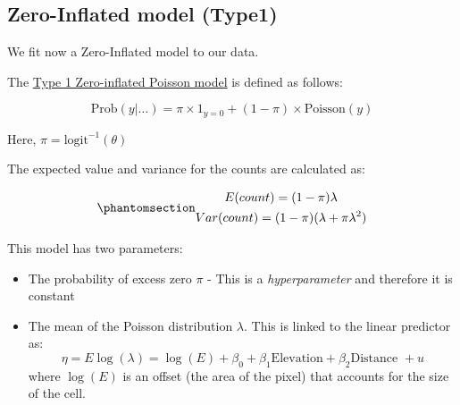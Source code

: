 \documentclass[
  letterpaper,
  DIV=11,
  numbers=noendperiod]{scrartcl}
\providecommand{\tightlist}{%
  \setlength{\itemsep}{0pt}\setlength{\parskip}{0pt}}\usepackage{longtable,booktabs,array}
\begin{document}
\subsection{Zero-Inflated model (Type1)}\label{sec-zip}

We fit now a Zero-Inflated model to our data.

The
\href{https://inla.r-inla-download.org/r-inla.org/doc/likelihood/zeroinflated.pdf}{Type
1 Zero-inflated Poisson model} is defined as follows:

\[
\text{Prob}(y\vert\dots)=\pi\times 1_{y=0}+(1-\pi)\times \text{Poisson}(y)
\]

Here, \(\pi=\text{logit}^{-1}(\theta)\)

The expected value and variance for the counts are calculated as:

\begin{equation}\phantomsection\label{eq-mean-zip}{
\begin{gathered}
E(count)=(1-\pi)\lambda \\
Var(count)= (1-\pi)(\lambda+\pi \lambda^2)
\end{gathered}
}\end{equation}

This model has two parameters:

\begin{itemize}
\tightlist
\item
  The probability of excess zero \(\pi\) - This is a
  \emph{hyperparameter} and therefore it is constant
\item
  The mean of the Poisson distribution \(\lambda\). This is linked to
  the linear predictor as: \[
  \eta = E\log(\lambda) = \log(E) + \beta_0 + \beta_1\text{Elevation} + \beta_2\text{Distance } + u
  \] where \(\log(E)\) is an offset (the area of the pixel) that
  accounts for the size of the cell.
\end{itemize}
\end{document}
